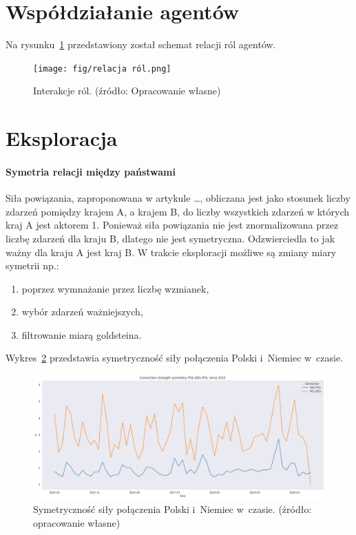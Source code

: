 \documentclass[11pt]{report}
\begin{document}
    \section{Współdziałanie agentów}
    Na rysunku~\ref{fig:relacje} przedstawiony został schemat relacji ról agentów.
    \begin{figure}[!ht]
        \centering
        \texttt{[image: fig/relacja ról.png]}
        \caption{Interakcje ról. (źródło: Opracowanie własne)}
        \label{fig:relacje}
    \end{figure}


    \section{Eksploracja}

    \paragraph{Symetria relacji między państwami}\label{symetria_relacji}
    Siła powiązania, zaproponowana w artykule \ldots, obliczana jest jako stosunek liczby zdarzeń pomiędzy krajem A, a krajem B, do liczby wszystkich zdarzeń w których kraj A jest aktorem 1.
    Ponieważ siła powiązania nie jest znormalizowana przez liczbę zdarzeń dla kraju B, dlatego nie jest symetryczna.
    Odzwierciedla to jak ważny dla kraju A jest kraj B\@.
    W trakcie eksploracji możliwe są zmiany miary symetrii np.:
    \begin{enumerate}
        \item poprzez wymnażanie przez liczbę wzmianek,
        \item wybór zdarzeń ważniejszych,
        \item filtrowanie miarą goldsteina.
    \end{enumerate}

    Wykres~\ref{fig:POL-DEU-POL} przedstawia symetryczność siły połączenia Polski i~Niemiec w~czasie.
    \begin{figure}[!htp]
        \centering
        \includegraphics[width=\linewidth]{fig/POL-DEU-POL.png}
        \caption{Symetryczność siły połączenia Polski i~Niemiec w~czasie. (źródło: opracowanie własne)}
        \label{fig:POL-DEU-POL}
    \end{figure}
\end{document}
